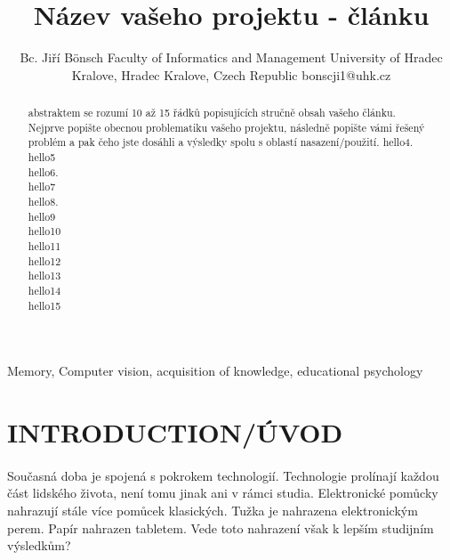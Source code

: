 \documentclass[journal]{IEEEtran}
\title{Název vašeho projektu - článku}
\author{Bc. Jiří Bönsch
        \linebreak
        Faculty of Informatics and Management
        \linebreak
        University of Hradec Kralove,
        \linebreak
        Hradec Kralove, Czech Republic
        \linebreak
        bonscji1@uhk.cz

}
\begin{document}
\maketitle

\begin{abstract} %
        abstraktem se rozumí 10 až 15 řádků popisujících stručně obsah vašeho článku. Nejprve popište obecnou problematiku vašeho projektu, následně popište vámi řešený problém a pak čeho jste dosáhli a výsledky spolu s oblastí nasazení/použití.
        hello4.\\
        hello5\\
        hello6.\\
        hello7\\
        hello8.\\
        hello9\\
        hello10\\
        hello11\\
        hello12\\
        hello13\\
        hello14\\
        hello15\\

\end{abstract}

\begin{IEEEkeywords} %
Memory, Computer vision, acquisition of knowledge, educational psychology
\end{IEEEkeywords}


\IEEEpeerreviewmaketitle



\section{INTRODUCTION/ÚVOD}

\paragraph{}
Současná doba je spojená s pokrokem technologií.
Technologie prolínají každou část lidského života, není tomu jinak ani v rámci studia.
Elektronické pomůcky nahrazují stále více pomůcek klasických.
Tužka je nahrazena elektronickým perem. Papír nahrazen tabletem.
Vede toto nahrazení však k lepším studijním výsledkům?
\end{document}
